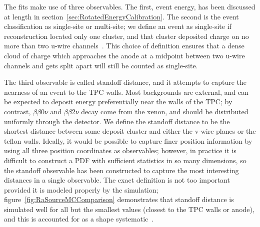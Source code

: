 The fits make use of three observables.  The first, event energy, has been discussed at length in section~\ref{sec:RotatedEnergyCalibration}.  The second is the event classification as single-site or multi-site; we define an event as single-site if reconstruction located only one cluster, and that cluster deposited charge on no more than two u-wire channels~\cite{FittingDocument}.  This choice of definition ensures that a dense cloud of charge which approaches the anode at a midpoint between two u-wire channels and gets split apart will still be counted as single-site.

The third observable is called standoff distance, and it attempts to capture the nearness of an event to the TPC walls.  Most backgrounds are external, and can be expected to deposit energy preferentially near the walls of the TPC; by contrast, $\beta\beta 0\nu$ and $\beta\beta 2\nu$ decay come from the xenon, and should be distributed uniformly through the detector.  We define the standoff distance to be the shortest distance between some deposit cluster and either the v-wire planes or the teflon walls.  Ideally, it would be possible to capture finer position information by using all three position coordinates as observables; however, in practice it is difficult to construct a PDF with sufficient statistics in so many dimensions, so the standoff observable has been constructed to capture the most interesting distances in a single observable.  The exact definition is not too important provided it is modeled properly by the simulation; figure~\ref{fig:RaSourceMCComparison} demonstrates that standoff distance is simulated well for all but the smallest values (closest to the TPC walls or anode), and this is accounted for as a shape systematic~\cite{FittingDocument}.

